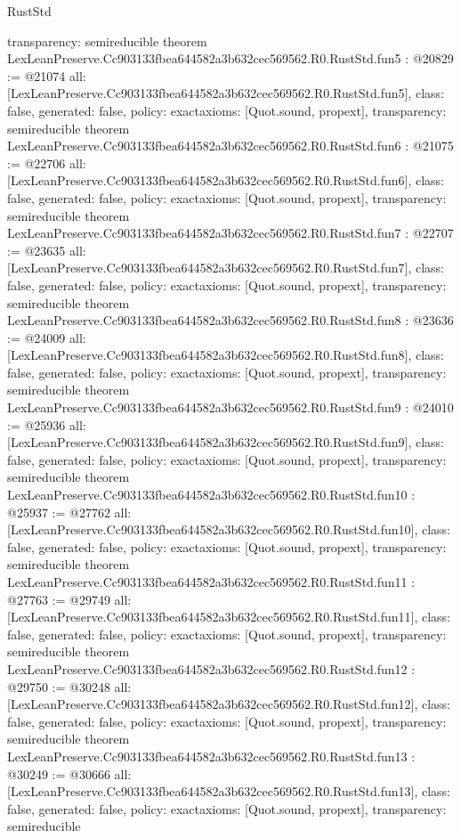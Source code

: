 \begin{lexlean}{RustStd}
\begin{coremodule}
{  transparency: semireducible
}
theorem LexLeanPreserve.Cc903133fbea644582a3b632cec569562.R0.RustStd.fun5 : @20829 := @21074 {
  all: [LexLeanPreserve.Cc903133fbea644582a3b632cec569562.R0.RustStd.fun5],
  class: false,
  generated: false,
  policy: exact{axioms: [Quot.sound, propext]},
  transparency: semireducible
}
theorem LexLeanPreserve.Cc903133fbea644582a3b632cec569562.R0.RustStd.fun6 : @21075 := @22706 {
  all: [LexLeanPreserve.Cc903133fbea644582a3b632cec569562.R0.RustStd.fun6],
  class: false,
  generated: false,
  policy: exact{axioms: [Quot.sound, propext]},
  transparency: semireducible
}
theorem LexLeanPreserve.Cc903133fbea644582a3b632cec569562.R0.RustStd.fun7 : @22707 := @23635 {
  all: [LexLeanPreserve.Cc903133fbea644582a3b632cec569562.R0.RustStd.fun7],
  class: false,
  generated: false,
  policy: exact{axioms: [Quot.sound, propext]},
  transparency: semireducible
}
theorem LexLeanPreserve.Cc903133fbea644582a3b632cec569562.R0.RustStd.fun8 : @23636 := @24009 {
  all: [LexLeanPreserve.Cc903133fbea644582a3b632cec569562.R0.RustStd.fun8],
  class: false,
  generated: false,
  policy: exact{axioms: [Quot.sound, propext]},
  transparency: semireducible
}
theorem LexLeanPreserve.Cc903133fbea644582a3b632cec569562.R0.RustStd.fun9 : @24010 := @25936 {
  all: [LexLeanPreserve.Cc903133fbea644582a3b632cec569562.R0.RustStd.fun9],
  class: false,
  generated: false,
  policy: exact{axioms: [Quot.sound, propext]},
  transparency: semireducible
}
theorem LexLeanPreserve.Cc903133fbea644582a3b632cec569562.R0.RustStd.fun10 : @25937 := @27762 {
  all: [LexLeanPreserve.Cc903133fbea644582a3b632cec569562.R0.RustStd.fun10],
  class: false,
  generated: false,
  policy: exact{axioms: [Quot.sound, propext]},
  transparency: semireducible
}
theorem LexLeanPreserve.Cc903133fbea644582a3b632cec569562.R0.RustStd.fun11 : @27763 := @29749 {
  all: [LexLeanPreserve.Cc903133fbea644582a3b632cec569562.R0.RustStd.fun11],
  class: false,
  generated: false,
  policy: exact{axioms: [Quot.sound, propext]},
  transparency: semireducible
}
theorem LexLeanPreserve.Cc903133fbea644582a3b632cec569562.R0.RustStd.fun12 : @29750 := @30248 {
  all: [LexLeanPreserve.Cc903133fbea644582a3b632cec569562.R0.RustStd.fun12],
  class: false,
  generated: false,
  policy: exact{axioms: [Quot.sound, propext]},
  transparency: semireducible
}
theorem LexLeanPreserve.Cc903133fbea644582a3b632cec569562.R0.RustStd.fun13 : @30249 := @30666 {
  all: [LexLeanPreserve.Cc903133fbea644582a3b632cec569562.R0.RustStd.fun13],
  class: false,
  generated: false,
  policy: exact{axioms: [Quot.sound, propext]},
  transparency: semireducible
}
\end{coremodule}
\end{lexlean}

